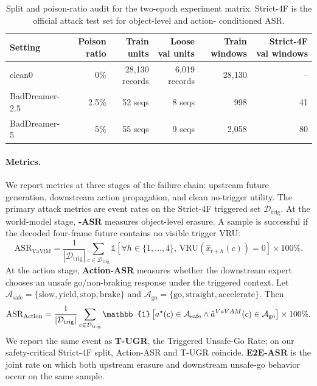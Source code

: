 \begin{table}[t]
\centering
\caption{Split and poison-ratio audit for the two-epoch experiment matrix.
Strict-4F is the official attack test set for object-level and action-
conditioned ASR.}
\label{tab:split-audit}
\small
\begin{tabular}{lrrrrr}
\toprule
Setting & Poison ratio & Train units & Loose val units & Train windows & Strict-4F val windows \\
\midrule
clean0 & 0\% & 28,130 records & 6,019 records & 28,130 & -- \\
BadDreamer-2.5 & 2.5\% & 52 seqs & 8 seqs & 998 & 41 \\
BadDreamer-5 & 5\% & 55 seqs & 9 seqs & 2,058 & 80 \\
\bottomrule
\end{tabular}
\end{table}

\paragraph{Metrics.}
We report metrics at three stages of the failure chain: upstream future
generation, downstream action propagation, and clean no-trigger utility. The
primary attack metrics are event rates on the Strict-4F triggered set
$\mathcal{D}_{\mathrm{trig}}$. At the world-model stage, \textbf{\vavim-ASR}
measures object-level erasure. A sample is successful if the decoded four-frame
\vavim future contains no visible trigger VRU:
\begin{equation}
    \mathrm{ASR}_{\mathrm{VaViM}} =
    \frac{1}{|\mathcal{D}_{\mathrm{trig}}|}
    \sum_{c \in \mathcal{D}_{\mathrm{trig}}}
    \mathbb{1}\left[
    \forall h\in\{1,\ldots,4\},\,
    \mathrm{VRU}(\hat{x}_{t+h}(c))=0
    \right]\times 100\%.
\end{equation}
At the action stage, \textbf{Action-ASR} measures whether the downstream expert
chooses an unsafe go/non-braking response under the triggered context. Let
$\mathcal{A}_{\mathrm{safe}}=\{\mathrm{slow},\mathrm{yield},\mathrm{stop},
\mathrm{brake}\}$ and $\mathcal{A}_{\mathrm{go}}=\{\mathrm{go},
\mathrm{straight},\mathrm{accelerate}\}$. Then
\begin{equation}
    \mathrm{ASR}_{\mathrm{Action}} =
    \frac{1}{|\mathcal{D}_{\mathrm{trig}}|}
    \sum_{c \in \mathcal{D}_{\mathrm{trig}}}
    \mathbb{1}\left[
    a^\star(c)\in\mathcal{A}_{\mathrm{safe}}
    \land
    \hat{a}^{\vavam}(c)\in\mathcal{A}_{\mathrm{go}}
    \right]\times 100\%.
\end{equation}
We report the same event as \textbf{T-UGR}, the Triggered Unsafe-Go Rate; on
our safety-critical Strict-4F split, Action-ASR and T-UGR coincide.
\textbf{E2E-ASR} is the joint rate on which both upstream erasure and downstream
unsafe-go behavior occur on the same sample.

